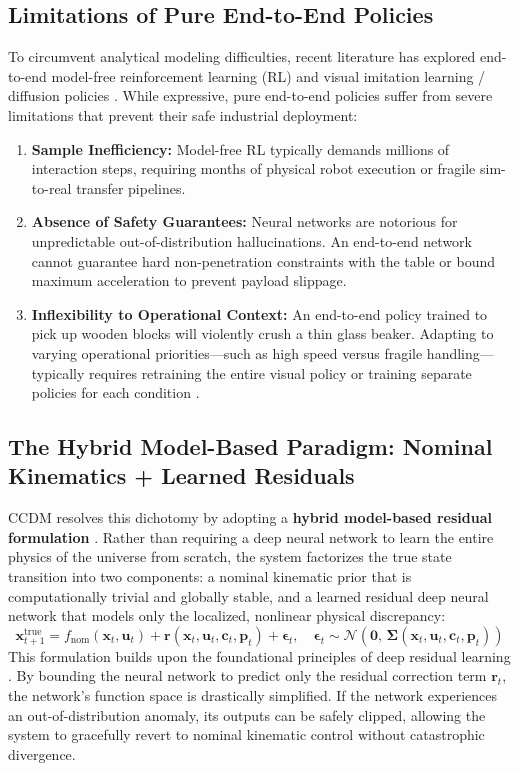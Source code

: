 \documentclass[10pt,a4paper]{article}
\begin{document}
\subsection{Limitations of Pure End-to-End Policies}
To circumvent analytical modeling difficulties, recent literature has explored end-to-end model-free reinforcement learning (RL) \cite{schulman2017proximal, haarnoja2018soft} and visual imitation learning / diffusion policies \cite{chi2023diffusion, mandlekar2021what}. While expressive, pure end-to-end policies suffer from severe limitations that prevent their safe industrial deployment:
\begin{enumerate}
    \item \textbf{Sample Inefficiency:} Model-free RL typically demands millions of interaction steps, requiring months of physical robot execution or fragile sim-to-real transfer pipelines.
    \item \textbf{Absence of Safety Guarantees:} Neural networks are notorious for unpredictable out-of-distribution hallucinations. An end-to-end network cannot guarantee hard non-penetration constraints with the table or bound maximum acceleration to prevent payload slippage.
    \item \textbf{Inflexibility to Operational Context:} An end-to-end policy trained to pick up wooden blocks will violently crush a thin glass beaker. Adapting to varying operational priorities---such as high speed versus fragile handling---typically requires retraining the entire visual policy or training separate policies for each condition \cite{kumar2021rma}.
\end{enumerate}

\subsection{The Hybrid Model-Based Paradigm: Nominal Kinematics + Learned Residuals}
CCDM resolves this dichotomy by adopting a \textbf{hybrid model-based residual formulation} \cite{nagabandi2018neural, chua2018deep}. Rather than requiring a deep neural network to learn the entire physics of the universe from scratch, the system factorizes the true state transition into two components: a nominal kinematic prior that is computationally trivial and globally stable, and a learned residual deep neural network that models only the localized, nonlinear physical discrepancy:
\begin{equation}
\mathbf{x}_{t+1}^{\mathrm{true}} = f_{\mathrm{nom}}(\mathbf{x}_t, \mathbf{u}_t) + \mathbf{r}(\mathbf{x}_t, \mathbf{u}_t, \mathbf{c}_t, \mathbf{p}_t) + \bm{\epsilon}_t, \quad \bm{\epsilon}_t \sim \mathcal{N}\left(\mathbf{0}, \, \bm{\Sigma}(\mathbf{x}_t, \mathbf{u}_t, \mathbf{c}_t, \mathbf{p}_t)\right)
\label{eq:hybrid_dynamics}
\end{equation}
This formulation builds upon the foundational principles of deep residual learning \cite{he2016deep}. By bounding the neural network to predict only the residual correction term $\mathbf{r}_t$, the network's function space is drastically simplified. If the network experiences an out-of-distribution anomaly, its outputs can be safely clipped, allowing the system to gracefully revert to nominal kinematic control without catastrophic divergence.
\end{document}
